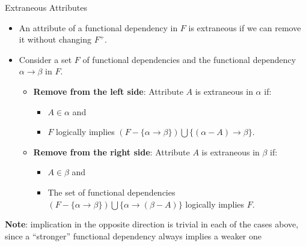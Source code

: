 \documentclass{beamer}
\begin{document}
\begin{frame}{Extraneous Attributes}
    \begin{itemize}
        \item An attribute of a functional dependency in $F$ is extraneous if we can remove it without changing $F^+$.
        \item Consider a set $F$ of functional dependencies and the functional dependency $\alpha \rightarrow \beta$ in $F$.
            \begin{itemize}
                \item \textbf{Remove from the left side}: Attribute $A$ is extraneous in $\alpha$ if:
                    \begin{itemize}
                        \item $A \in \alpha$ and
                        \item $F$ logically implies $(F - \{ \alpha \rightarrow \beta \}) \bigcup \{(\alpha - A) \rightarrow \beta \}$.
                    \end{itemize}
                \item \textbf{Remove from the right side}: Attribute $A$ is extraneous in $\beta$ if:
                    \begin{itemize}
                        \item $A \in \beta$ and
                        \item The set of functional dependencies $(F - \{ \alpha \rightarrow \beta \}) \bigcup \{ \alpha \rightarrow (\beta - A) \}$ logically implies $F$.
                    \end{itemize}
            \end{itemize}
    \end{itemize}
    \textbf{Note}: implication in the opposite direction is trivial in each of the cases above, since a ``stronger'' functional dependency always implies a weaker one
\end{frame}
\end{document}
